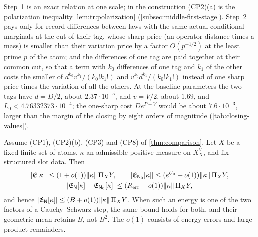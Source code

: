 \begin{remark}
Step~1 is an exact relation at one scale; in the construction (CP2)(a) is
the polarization inequality \cref{lem:tr:polarization}
(\cref{subsec:middle-first-stage}).
Step~2 pays only for record differences between laws with the same actual
conditional marginals at the cut of their tag, whose sharp price
(an operator distance times a mass) is smaller than their
variation price by a factor $O(p^{-1/2})$ at the least prime $p$
of the atom; and the differences of one tag are paid together at
their
common cut, so that a term with $k_0$ differences of one tag and $k_1$ of the
other costs the smaller of $d^{k_0}v^{k_1}/(k_0!k_1!)$ and
$v^{k_0}d^{k_1}/(k_0!k_1!)$ instead of one sharp price times the variation of
all the others. At the baseline parameters the two tags have $d=D/2$, about
$2.37\cdot10^{-5}$, and $v=V/2$, about $1.69$, and
$L_0<4.76332373\cdot10^{-4}$; the one-sharp cost $De^{P+V}$ would be about
$7.6\cdot10^{-3}$, larger than the margin of the closing by eight orders of
magnitude (\cref{tab:closing-values}).
\end{remark}

\begin{lemma}\label{lem:bracket-energy}
Assume (CP1), (CP2)(b), (CP3) and (CP8) of \cref{thm:comparison}. Let $X$ be a
fixed finite set of atoms, $\kappa$ an admissible positive measure on $X_X^V$, and
fix structured slot data. Then
\begin{gather*}
 |\mathfrak E[\kappa]|\le(1+o(1))\|\kappa\|\,\Pi_XY,\qquad
 |\mathfrak E_{\mathsf N_0}[\kappa]|\le(e^{U_0}+o(1))\|\kappa\|\,\Pi_XY,\\
 |\mathfrak E_{\mathsf N}[\kappa]-\mathfrak E_{\mathsf N_0}[\kappa]|
 \le(R_{\rm err}+o(1))\|\kappa\|\,\Pi_XY,
\end{gather*}
and hence $|\mathfrak E_{\mathsf N}[\kappa]|\le(B+o(1))\|\kappa\|\,\Pi_XY$. When such
an energy is one of the two factors of a Cauchy--Schwarz step, the same bound
holds for both, and their geometric mean retains $B$, not $B^2$. The $o(1)$
consists of energy errors and large-product remainders.
\end{lemma}

